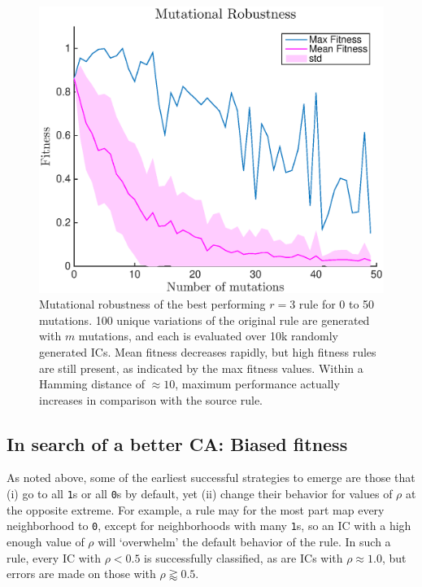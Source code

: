 \begin{figure}
\begin{center}
\includegraphics[width=\linewidth]{figures/mutational_robustness.eps}
\caption{Mutational robustness of the best performing $r = 3$ rule for 0 to 50 mutations. 100 unique variations of the 
original rule are generated with $m$ mutations, and each is evaluated over 10k randomly generated ICs. Mean fitness decreases 
rapidly, but high fitness rules are still present, as indicated by the max fitness values. Within a Hamming distance of $\approx 10$, maximum performance 
actually increases in comparison with the source rule. }
\label{fig:robustness}
\end{center}
\end{figure}

\subsection{In search of a better CA: Biased fitness} \label{sec:2_3}

As noted above, some of the earliest successful strategies to emerge are those that (i) go to all \texttt{1}s or all \texttt{0}s by default, 
yet (ii) change their behavior for values of $\rho$ at the opposite extreme. For example, a rule may for the most part map every 
neighborhood to \texttt{0}, except for neighborhoods with many \texttt{1}s, so an IC with a high enough value of $\rho$ will 
`overwhelm' the default behavior of the rule. In such a rule, every IC with $\rho < 0.5$ is successfully classified, as are ICs with $\rho \approx 1.0$, but 
errors are made on those with $\rho \gtrapprox 0.5$.

